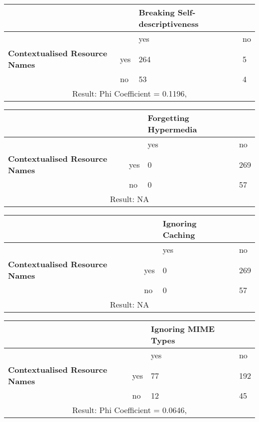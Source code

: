 \documentclass[a4paper,12pt]{article}
\begin{document}
\begin{center}
  \begin{tabular}{| p{60mm} | p{10mm} | p{35mm} | p{35mm} |}
  \hline
   & & \textbf{Breaking Self-descriptiveness} &
  \\
  \hline
  & & yes & no
  \\
  \hline
  \textbf{Contextualised Resource Names} & yes & 264 & 5
  \\
  \hline
   & no & 53 & 4
  \\
  \hline
  \multicolumn{4}{|c|}{Result: Phi Coefficient = 0.1196, }
  \\ \hline
  \end{tabular}
  \end{center}

\begin{center}
  \begin{tabular}{| p{60mm} | p{10mm} | p{35mm} | p{35mm} |}
  \hline
   & & \textbf{Forgetting Hypermedia} &
  \\
  \hline
  & & yes & no
  \\
  \hline
  \textbf{Contextualised Resource Names} & yes & 0 & 269
  \\
  \hline
   & no & 0 & 57
  \\
  \hline
  \multicolumn{4}{|c|}{Result: NA}
  \\ \hline
  \end{tabular}
  \end{center}

\begin{center}
  \begin{tabular}{| p{60mm} | p{10mm} | p{35mm} | p{35mm} |}
  \hline
   & & \textbf{Ignoring Caching} &
  \\
  \hline
  & & yes & no
  \\
  \hline
  \textbf{Contextualised Resource Names} & yes & 0 & 269
  \\
  \hline
   & no & 0 & 57
  \\
  \hline
  \multicolumn{4}{|c|}{Result: NA}
  \\ \hline
  \end{tabular}
  \end{center}

\begin{center}
  \begin{tabular}{| p{60mm} | p{10mm} | p{35mm} | p{35mm} |}
  \hline
   & & \textbf{Ignoring MIME Types} &
  \\
  \hline
  & & yes & no
  \\
  \hline
  \textbf{Contextualised Resource Names} & yes & 77 & 192
  \\
  \hline
   & no & 12 & 45
  \\
  \hline
  \multicolumn{4}{|c|}{Result: Phi Coefficient = 0.0646, }
  \\ \hline
  \end{tabular}
  \end{center}
\end{document}

